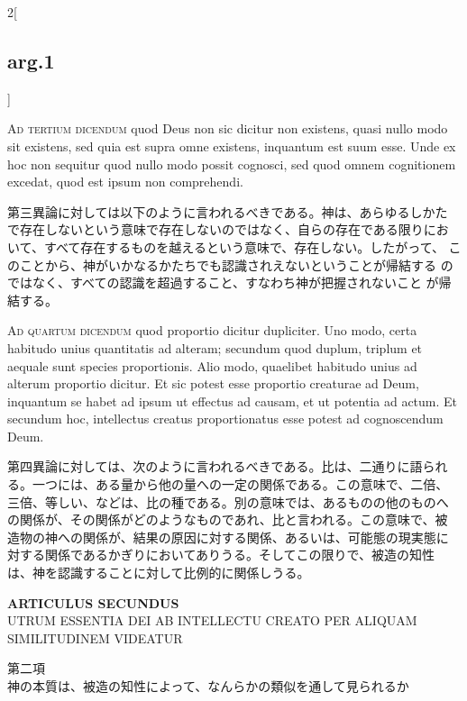 \documentclass[paper=a4paper,fontsize=10pt,jafontsize=9pt,titlepage]{jlreq}
\begin{document}
\begin{paracol}{2}[\subsection{arg.1}]
\switchcolumn*[\subsection{ad.3}]

{\scshape  Ad tertium dicendum} quod Deus non sic dicitur non existens,
 quasi nullo modo sit existens, sed quia est supra omne existens,
 inquantum est suum esse. Unde ex hoc non sequitur quod nullo modo
 possit cognosci, sed quod omnem cognitionem excedat, quod est ipsum non
 comprehendi.

\switchcolumn

第三異論に対しては以下のように言われるべきである。神は、あらゆるしかた
で存在しないという意味で存在しないのではなく、自らの存在である限りにお
いて、すべて存在するものを越えるという意味で、存在しない。したがって、
このことから、神がいかなるかたちでも認識されえないということが帰結する
のではなく、すべての認識を超過すること、すなわち神が把握されないこと
が帰結する。

\switchcolumn*[\subsection{ad.4}]

{\scshape Ad quartum dicendum} quod proportio dicitur dupliciter. Uno modo,
certa habitudo unius quantitatis ad alteram; secundum quod duplum,
triplum et aequale sunt species proportionis. Alio modo, quaelibet
habitudo unius ad alterum proportio dicitur. Et sic potest esse
proportio creaturae ad Deum, inquantum se habet ad ipsum ut effectus
ad causam, et ut potentia ad actum. Et secundum hoc, intellectus
creatus proportionatus esse potest ad cognoscendum Deum.

\switchcolumn

第四異論に対しては、次のように言われるべきである。比は、二通りに語られ
る。一つには、ある量から他の量への一定の関係である。この意味で、二倍、
三倍、等しい、などは、比の種である。別の意味では、あるものの他のものへ
の関係が、その関係がどのようなものであれ、比と言われる。この意味で、被
造物の神への関係が、結果の原因に対する関係、あるいは、可能態の現実態に
対する関係であるかぎりにおいてありうる。そしてこの限りで、被造の知性
は、神を認識することに対して比例的に関係しうる。

\end{paracol}

\newpage
{}

\begin{center}
{\Large {\bfseries ARTICULUS SECUNDUS}}\\
{\large UTRUM ESSENTIA DEI AB INTELLECTU CREATO PER ALIQUAM
 SIMILITUDINEM VIDEATUR} 

{\large 第二項\\
神の本質は、被造の知性によって、なんらかの類似を通して見られるか}
\end{center}
\end{document}

